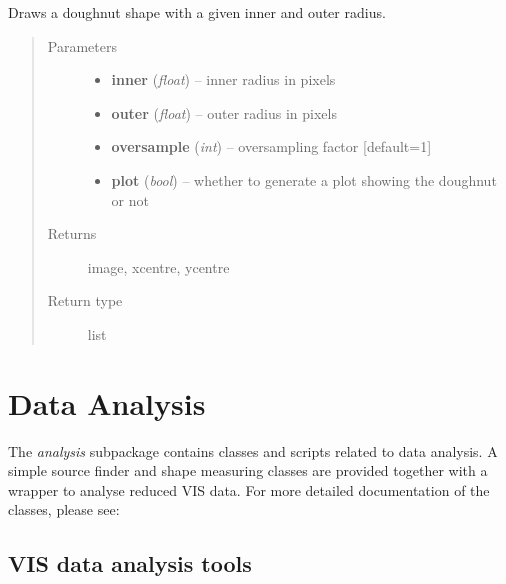 \documentclass[a4paper,11pt,english]{sphinxmanual}
\begin{document}

\begin{fulllineitems}
\label{reduction:analysis.analyseGhosts.drawDoughnut}
Draws a doughnut shape with a given inner and outer radius.
\begin{quote}\begin{description}
\item[{Parameters}] \leavevmode\begin{itemize}
\item {} 
\textbf{inner} (\emph{float}) -- inner radius in pixels

\item {} 
\textbf{outer} (\emph{float}) -- outer radius in pixels

\item {} 
\textbf{oversample} (\emph{int}) -- oversampling factor {[}default=1{]}

\item {} 
\textbf{plot} (\emph{bool}) -- whether to generate a plot showing the doughnut or not

\end{itemize}

\item[{Returns}] \leavevmode
image, xcentre, ycentre

\item[{Return type}] \leavevmode
list

\end{description}\end{quote}

\end{fulllineitems}



\chapter{Data Analysis}
\label{index:data-analysis}
The \emph{analysis} subpackage contains classes and scripts related to data analysis. A simple source finder and shape
measuring classes are provided together with a wrapper to analyse reduced VIS data. For more detailed
documentation of the classes, please see:


\section{VIS data analysis tools}
\label{analysis::doc}\label{analysis:module-analysis.analyse}\label{analysis:vis-data-analysis-tools}
\end{document}
